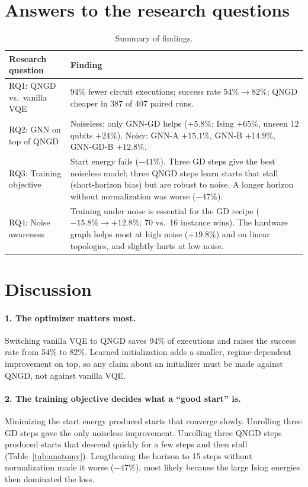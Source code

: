 \documentclass{ssnreview}
\begin{document}
\section{Answers to the research questions}

\begin{table}[H]
\centering
\caption{Summary of findings.}\label{tab:rq}
\small
\begin{tabularx}{\textwidth}{L{4.3cm}Y}
\toprule
Research question & Finding \\
\midrule
RQ1: QNGD vs.\ vanilla VQE & 94\% fewer circuit executions; success rate 54\%$\to$82\%; QNGD cheaper in 387 of 407 paired runs. \\
RQ2: GNN on top of QNGD & Noiseless: only GNN-GD helps ($+5.8\%$; Ising $+65\%$, unseen 12 qubits $+24\%$). Noisy: GNN-A $+15.1\%$, GNN-B $+14.9\%$, GNN-GD-B $+12.8\%$. \\
RQ3: Training objective & Start energy fails ($-41\%$). Three GD steps give the best noiseless model; three QNGD steps learn starts that stall (short-horizon bias) but are robust to noise. A longer horizon without normalization was worse ($-47\%$). \\
RQ4: Noise awareness & Training under noise is essential for the GD recipe ($-15.8\%\to+12.8\%$; 70 vs.\ 16 instance wins). The hardware graph helps most at high noise ($+19.8\%$) and on linear topologies, and slightly hurts at low noise. \\
\bottomrule
\end{tabularx}
\end{table}

\section{Discussion}

\paragraph{1. The optimizer matters most.} Switching vanilla VQE to QNGD saves 94\% of
executions and raises the success rate from 54\% to 82\%. Learned initialization adds a smaller,
regime-dependent improvement on top, so any claim about an initializer must be made against
QNGD, not against vanilla VQE.

\paragraph{2. The training objective decides what a ``good start'' is.} Minimizing the start
energy produced starts that converge slowly. Unrolling three GD steps gave the only noiseless
improvement. Unrolling three QNGD steps produced starts that descend quickly for a few steps and
then stall (Table~\ref{tab:anatomy}). Lengthening the horizon to 15 steps without normalization
made it worse ($-47\%$), most likely because the large Ising energies then dominated the loss.
\end{document}
